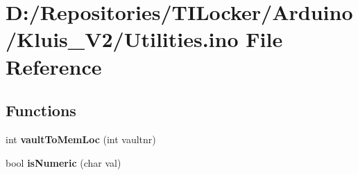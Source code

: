 \hypertarget{_utilities_8ino}{}\section{D\+:/\+Repositories/\+T\+I\+Locker/\+Arduino/\+Kluis\+\_\+\+V2/\+Utilities.ino File Reference}
\label{_utilities_8ino}
\subsection*{Functions}
\begin{DoxyCompactItemize}
\item 
\mbox{\label{_utilities_8ino_a1ac10230ef7e4b3a4cafcb659c005d4e}} 
int {\bfseries vault\+To\+Mem\+Loc} (int vaultnr)
\item 
\mbox{\label{_utilities_8ino_a7a1197316a36ea45533f770453fd6e64}} 
bool {\bfseries is\+Numeric} (char val)
\end{DoxyCompactItemize}
